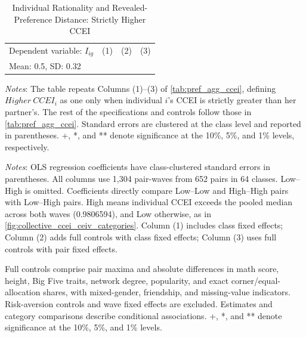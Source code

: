 \documentclass[11 pt]{article}
\renewcommand{\arraystretch}{1.2} %
\begin{document}
\begin{table}[H]
\centering
\singlespacing
\caption{Individual Rationality and Revealed-Preference Distance: Strictly Higher CCEI}
\label{tab:pref_agg_ccei_bothlow}
\begin{tabular}{lccc}
\toprule \hline
Dependent variable: $I_{ig}$ & (1) & (2) & (3) \\ 
\multicolumn{4}{l}{\hspace{1em} Mean: 0.5, SD: 0.32} \\ \midrule

\end{tabular}
\begin{minipage}{\textwidth}
{\footnotesize \emph{Notes}: The table repeats Columns (1)--(3) of \autoref{tab:pref_agg_ccei}, defining $Higher\ CCEI_i$ as one only when individual $i$'s CCEI is strictly greater than her partner's. The rest of the specifications and controls follow those in \autoref{tab:pref_agg_ccei}. Standard errors are clustered at the class level and reported in parentheses. +, *, and ** denote significance at the 10\%, 5\%, and 1\% levels, respectively.}
\end{minipage}
\end{table}

\begin{table}[H]
\centering
\singlespacing
\small
\caption{Individual Rationality and Collective Outcomes}
\label{tab:collective_ccei_ceiv_categories}
\setlength{\tabcolsep}{9pt}
\renewcommand{\arraystretch}{1.12}

\par\vspace{8pt}
\begin{minipage}{\textwidth}
{\footnotesize \emph{Notes}: OLS regression coefficients have class-clustered standard errors in parentheses. All columns
use 1,304 pair-waves from 652 pairs in 64 classes. Low--High is omitted. Coefficients directly compare Low--Low and High--High pairs with Low--High pairs. High means individual CCEI exceeds
the pooled median across both waves (0.9806594), and Low otherwise, as in \autoref{fig:collective_ccei_ceiv_categories}. Column (1) includes
class fixed effects; Column (2) adds full controls with class fixed effects; Column (3) uses full controls
with pair fixed effects.

Full controls comprise pair maxima and absolute differences in math score, height, Big Five traits,
network degree, popularity, and exact corner/equal-allocation shares, with mixed-gender, friendship,
and missing-value indicators. Risk-aversion controls and wave fixed effects are excluded.
Estimates and category comparisons describe conditional associations. +, *, and ** denote significance
at the 10\%, 5\%, and 1\% levels.}
\end{minipage}
\end{table}
\end{document}
